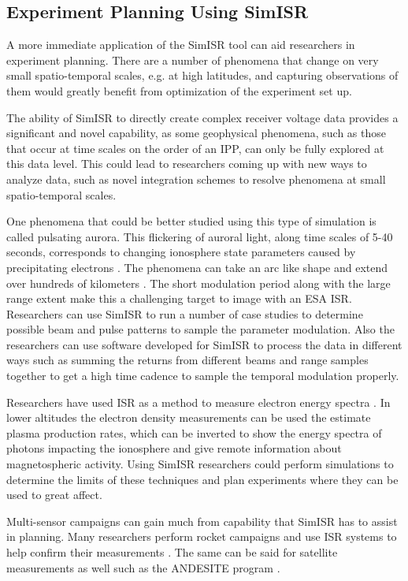 \subsection{Experiment Planning Using SimISR}

A more immediate application of the SimISR tool can aid researchers in experiment planning. There are a number of phenomena that change on very small spatio-temporal scales, e.g. at high latitudes, and capturing observations of them would greatly benefit from optimization of the experiment set up. 

The ability of SimISR to directly create complex receiver voltage data provides a significant and novel capability, as some geophysical phenomena, such as those that occur at time scales on the order of an IPP, can only be fully explored at this data level. This could lead to researchers coming up with new ways to analyze data, such as novel integration schemes to resolve phenomena at small spatio-temporal scales.

One phenomena that could be better studied using this type of simulation is called pulsating aurora. This flickering of auroral light, along time scales of 5-40 seconds, corresponds to changing ionosphere state parameters caused by precipitating electrons \cite{JGRA:JGRA21510}. The phenomena can take an arc like shape and extend over hundreds of kilometers \cite{JGRA:JGRA20202}. The short modulation period along with the large range extent make this a challenging target to image with an ESA ISR. Researchers can use SimISR to run a number of case studies to determine possible beam and pulse patterns to sample the parameter modulation. Also the researchers can use software developed for SimISR to process the data in different ways such as summing the returns from different beams and range samples together to get a high time cadence to sample the temporal modulation properly. 

Researchers have used ISR as a method to measure electron energy spectra \cite{Semeter:2005foa}. In lower altitudes the electron density measurements can be used the estimate plasma production rates, which can be inverted to show the energy spectra of photons impacting the ionosphere and give remote information about magnetospheric activity. Using SimISR researchers could perform simulations to determine the limits of these techniques and plan experiments where they can be used to great affect.

Multi-sensor campaigns can gain much from capability that SimISR has to assist in planning. Many researchers perform rocket campaigns and use ISR systems to help confirm their measurements \cite{JGRA:JGRA50924}. The same can be said for satellite measurements as well such as the ANDESITE program \cite{parham2016multi}. 

